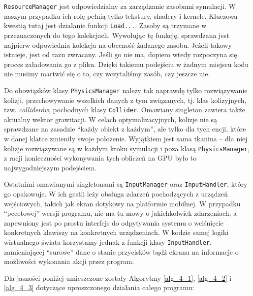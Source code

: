 	\texttt{ResourceManager} jest odpowiedzialny za zarządzanie zasobami symulacji. W naszym przypadku ich rolę pełnią tylko tekstury, shadery i kernele. Kluczową kwestią tutaj jest działanie funkcji \texttt{Load...}. Zasoby są trzymane w przeznaczonych do tego kolekcjach. Wywołując tę funkcję, sprawdzana jest najpierw odpowiednia kolekcja na obecność żądanego zasobu. Jeżeli takowy istnieje, jest od razu zwracany. Jeśli go nie ma, dopiero wtedy rozpoczyna się proces załadowania go z pliku. Dzięki takiemu podejściu w żadnym miejscu kodu nie musimy martwić się o to, czy wczytaliśmy zasób, czy jeszcze nie.
	
	Do obowiązków klasy \texttt{PhysicsManager} należy tak naprawdę tylko rozwiązywanie kolizji, przechowywanie wszelkich danych z tym związanych, tj. klas kolizyjnych, tzw. \emph{colliderów}, pochodnych klasy \texttt{Collider}. Omawiany singleton zawiera także aktualny wektor grawitacji. W celach optymalizacyjnych, kolizje nie są sprawdzane na zasadzie ``każdy obiekt z każdym'', ale tylko dla tych encji, które w danej klatce zmieniły swoje położenie. Wyjątkiem jest sama tkanina -- dla niej kolizje rozwiązywane są w każdym kroku symulacji i poza klasą \texttt{PhysicsManager}, z racji konieczności wykonywania tych obliczeń na GPU było to najwygodniejszym podejściem.
	
	Ostatnimi omawianymi singletonami są \texttt{InputManager} oraz \texttt{InputHandler}, który go opakowuje. W ich gestii leży obsługa zdarzeń pochodzących z urządzeń wejściowych, takich jak ekran dotykowy na platformie mobilnej. W przypadku ``pecetowej'' wersji programu, nie ma tu mowy o jakichkolwiek zdarzeniach, a zapewniony jest po prostu interfejs do odpytywania systemu o wciśnięcie konkretnych klawiszy na konkretnych urządzeniach. W kodzie samej logiki wirtualnego świata korzystamy jednak z funkcji klasy \texttt{InputHandler}, zamieniającej ``surowe'' dane o stanie przycisków bądź ekranu na informacje o możliwości wykonania akcji przez program.
	
	Dla jasności poniżej umieszczone zostały Algorytmy \ref{alg_4_1}, \ref{alg_4_2} i \ref{alg_4_3} dotyczące uproszczonego działania całego programu:
	
